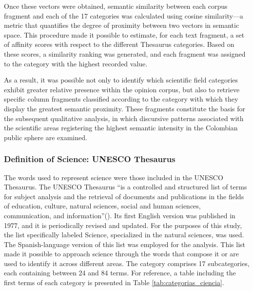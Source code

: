 \documentclass[11pt,a4paper]{article}
\begin{document}
Once these vectors were obtained, semantic similarity between each corpus fragment and each of the 17 categories was calculated using cosine similarity—a metric that quantifies the degree of proximity between two vectors in semantic space. This procedure made it possible to estimate, for each text fragment, a set of affinity scores with respect to the different Thesaurus categories. Based on these scores, a similarity ranking was generated, and each fragment was assigned to the category with the highest recorded value.

As a result, it was possible not only to identify which scientific field categories exhibit greater relative presence within the opinion corpus, but also to retrieve specific column fragments classified according to the category with which they display the greatest semantic proximity. These fragments constitute the basis for the subsequent qualitative analysis, in which discursive patterns associated with the scientific areas registering the highest semantic intensity in the Colombian public sphere are examined.
	
\subsubsection{Definition of Science: UNESCO Thesaurus}

The words used to represent science were those included in the UNESCO Thesaurus. The UNESCO Thesaurus ``is a controlled and structured list of terms for subject analysis and the retrieval of documents and publications in the fields of education, culture, natural sciences, social and human sciences, communication, and information''(\cite{unesco_thesaurus_1977}). Its first English version was published in 1977, and it is periodically revised and updated. For the purposes of this study, the list specifically labeled Science, specialized in the natural sciences, was used. The Spanish-language version of this list was employed for the analysis. This list made it possible to approach science through the words that compose it or are used to identify it across different areas. The category comprises 17 subcategories, each containing between 24 and 84 terms. For reference, a table including the first terms of each category is presented in Table \ref{tab:categorias_ciencia}.
\end{document}
